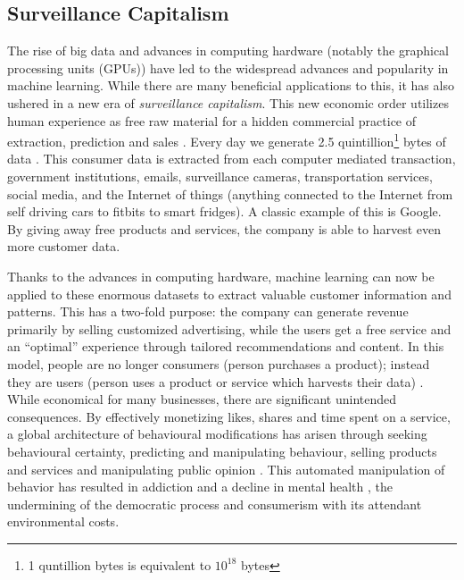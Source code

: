 \documentclass{article}
\begin{document}
\subsection{Surveillance Capitalism}
The rise of big data and advances in computing hardware (notably the graphical processing units (GPUs)) have led to the widespread advances and popularity in machine learning. While there are many beneficial applications to this, it has also ushered in a new era of \textit{surveillance capitalism}. This new economic order utilizes human experience as free raw material for a hidden commercial practice of extraction, prediction and sales \cite{zuboff2019surveillance}. Every day we generate 2.5 quintillion\footnote{1 quntillion bytes is equivalent to $10^{18}$ bytes} bytes of data \cite{forbes2018bigdata}. This consumer data is extracted from each computer mediated transaction, government institutions, emails, surveillance cameras, transportation services, social media, and the Internet of things (anything connected to the Internet from self driving cars to fitbits to smart fridges). A classic example of this is Google. By giving away free products and services, the company is able to harvest even more customer data.

Thanks to the advances in computing hardware, machine learning can now be applied to these enormous datasets to extract valuable customer information and patterns. This has a two-fold purpose: the company can generate revenue primarily by selling customized advertising, while the users get a free service and an “optimal” experience through tailored recommendations and content. In this model, people are no longer consumers (person purchases a product); instead they are users (person uses a product or service which harvests their data) \cite{zuboff2019surveillance}. While economical for many businesses, there are significant unintended consequences. By effectively monetizing likes, shares and time spent on a service, a global architecture of behavioural modifications has arisen through seeking behavioural certainty, predicting and manipulating behaviour, selling products and services and manipulating public opinion \cite{landwehr2019high}. This automated manipulation of behavior has resulted in addiction and a decline in mental health \cite{shakya2017association}, the undermining of the democratic process \cite{vaidhyanathan2018antisocial} and consumerism with its attendant environmental costs.
\end{document}
